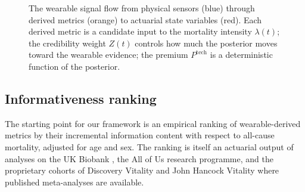 \begin{figure}[ht]
\caption{The wearable signal flow from physical sensors (blue) through
derived metrics (orange) to actuarial state variables (red). Each
derived metric is a candidate input to the mortality intensity
$\lambda(t)$; the credibility weight $Z(t)$ controls how much the
posterior moves toward the wearable evidence; the premium
$P^{\mathrm{tech}}$ is a deterministic function of the posterior.}
\label{fig:signal-flow}
\end{figure}

\subsection{Informativeness ranking}\label{ss:rank}

The starting point for our framework is an empirical ranking of
wearable-derived metrics by their incremental information content
with respect to all-cause mortality, adjusted for age and sex. The
ranking is itself an actuarial output of analyses on the UK Biobank
\citep{Biobank2024}, the All of Us research programme, and the
proprietary cohorts of Discovery Vitality and John Hancock Vitality
where published meta-analyses are available.

